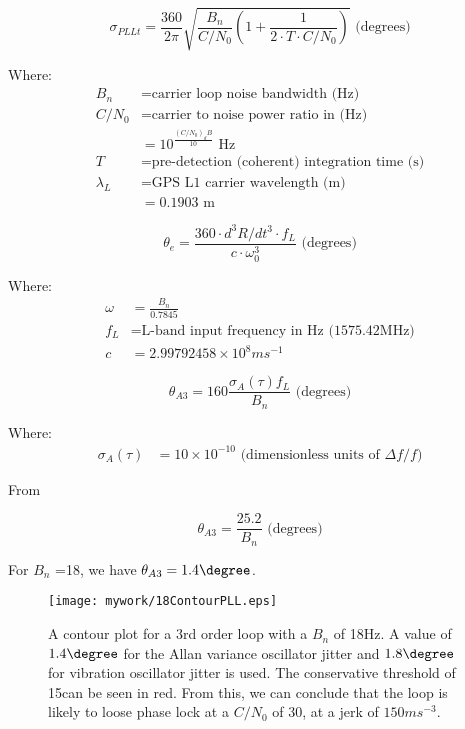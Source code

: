 \begin{equation}
\sigma_{PLLt} = \frac{360}{2 \pi} \sqrt{\frac{B_n}{C/N_0}(1+\frac{1}{2 \cdot T \cdot C/N_0})} \text{ (degrees)}
\end{equation}

Where:
\begin{align*}
B_n &= \text{carrier loop noise bandwidth (Hz)} \\
C/N_0 &= \text{carrier to noise power ratio in (Hz)} \\
&=10^\frac{(C/N_0)_dB}{10} \text{ Hz}\\
T &= \text{pre-detection (coherent) integration time (s)} \\
\lambda_L &= \text{GPS L1 carrier wavelength (m)}\\
&= 0.1903 \text{ m}
\end{align*}


\begin{equation}
\theta_e = \frac{360 \cdot d^3R/dt^3  \cdot f_L}{c  \cdot \omega^3_0} \text{ (degrees)}
\end{equation}


Where:
\begin{align*}
\omega &= \frac{B_n}{0.7845} \\
f_L &= \text{L-band input frequency in Hz (1575.42MHz)}\\ 
c & = 2.99792458 \times 10^8 ms^{-1}
\end{align*}




\begin{equation}
\theta_{A3} = 160 \frac{\sigma_A(\tau)f_L}{B_n} \text{ (degrees)}
\end{equation}

Where:
\begin{align*}
\sigma_A(\tau) &= 10 \times 10^{-10} \text{ (dimensionless units of }\Delta f/f\text{)}
\end{align*}

From \cite{VT803Datasheet}


\begin{equation}
\theta_{A3} =\frac{25.2}{B_n} \text{ (degrees)}
\end{equation}

For $B_n$ =18, we have $\theta_{A3}=1.4\degree$.


\begin{figure}[!htb] 
    \centering
    \texttt{[image: mywork/18ContourPLL.eps]} 
    \caption{A contour plot for a 3rd order loop with a $B_n$ of 18Hz. A value of $1.4\degree$ for the Allan variance oscillator jitter and $1.8\degree$ for vibration oscillator jitter is used. The conservative threshold of 15\degree can be seen in red. From this, we can conclude that the loop is likely to loose phase lock at a $C/N_0$ of 30,  at a jerk of $150ms^{-3}$.}
\end{figure}

